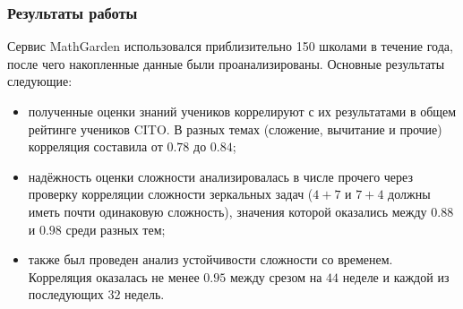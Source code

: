 \documentclass[14pt]{matmex-diploma}
\begin{document}
\subsubsection{Результаты работы}
\indent Сервис MathGarden использовался приблизительно 150 школами в течение года, после чего накопленные данные были проанализированы. Основные результаты следующие:
\begin{itemize}
    \item полученные оценки знаний учеников коррелируют с их результатами в общем рейтинге учеников CITO. В разных темах (сложение, вычитание и прочие) корреляция составила от $0.78$ до $0.84$;
    \item надёжность оценки сложности анализировалась в числе прочего через проверку корреляции сложности зеркальных задач ($4+7$ и $7+4$ должны иметь почти одинаковую сложность), значения которой оказались между $0.88$ и $0.98$ среди разных тем;
    \item также был проведен анализ устойчивости сложности со временем. Корреляция оказалась не менее $0.95$ между срезом на $44$ неделе и каждой из последующих $32$ недель.
\end{itemize}
\end{document}
